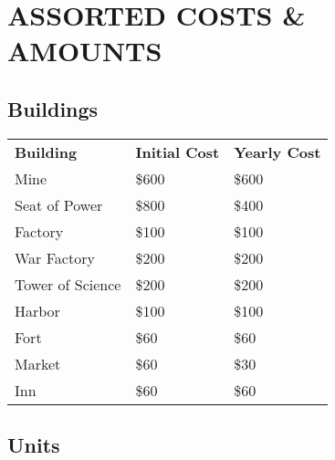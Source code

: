 
\chapter[Assorted Costs and Amounts]{{\Huge A}SSORTED {\Huge C}OSTS {\Huge \&} {\Huge A}MOUNTS}


\section{\textsf{Buildings}}

\begin{tabular}{|p{1.3in} p{1.3in} p{1.3in}|}
    \hline
    \textbf{Building} & \textbf{Initial Cost} & \textbf{Yearly Cost} \\ 
    \rowcolor{gray}Mine & \$600 & \$600 \\ 
    Seat of Power & \$800 & \$400 \\ 
    \rowcolor{gray}Factory    & \$100 & \$100 \\ 
    War Factory    & \$200 & \$200 \\ 
    \rowcolor{gray}Tower of Science & \$200 & \$200 \\ 
    Harbor & \$100 &\$100 \\ 
    \rowcolor{gray}Fort & \$60 & \$60 \\ 
    Market & \$60 & \$30 \\ 
    \rowcolor{gray}Inn    & \$60 & \$60 \\ 
    \hline
\end{tabular}    

\clearpage

\section{\textsf{Units}}

